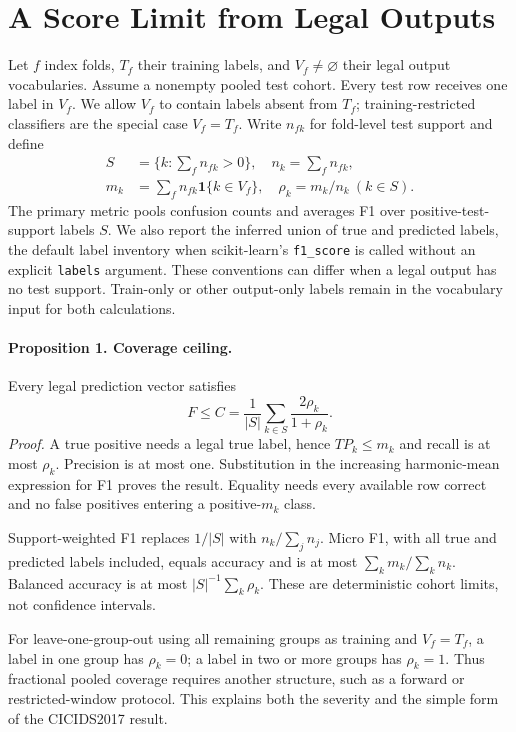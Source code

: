 \documentclass[journal]{IEEEtran}
\begin{document}
\section{A Score Limit from Legal Outputs}
Let \(f\) index folds, \(T_f\) their training labels, and \(V_f\ne\varnothing\) their legal output vocabularies. Assume a nonempty pooled test cohort. Every test row receives one label in \(V_f\). We allow \(V_f\) to contain labels absent from \(T_f\); training-restricted classifiers are the special case \(V_f=T_f\). Write \(n_{fk}\) for fold-level test support and define
\[
\begin{aligned}
S&=\{k:\textstyle\sum_f n_{fk}>0\},\quad n_k=\sum_f n_{fk},\\
m_k&=\sum_fn_{fk}\mathbf{1}\{k\in V_f\},\quad \rho_k=m_k/n_k\ (k\in S).
\end{aligned}
\]
The primary metric pools confusion counts and averages F1 over positive-test-support labels \(S\). We also report the inferred union of true and predicted labels, the default label inventory when scikit-learn's \texttt{f1\_score} is called without an explicit \texttt{labels} argument. These conventions can differ when a legal output has no test support. Train-only or other output-only labels remain in the vocabulary input for both calculations.

\paragraph{Proposition 1. Coverage ceiling.}
Every legal prediction vector satisfies
\[
F\le C=\frac{1}{|S|}\sum_{k\in S}\frac{2\rho_k}{1+\rho_k}.
\]
\emph{Proof.} A true positive needs a legal true label, hence \(TP_k\le m_k\) and recall is at most \(\rho_k\). Precision is at most one. Substitution in the increasing harmonic-mean expression for F1 proves the result. Equality needs every available row correct and no false positives entering a positive-\(m_k\) class.

Support-weighted F1 replaces \(1/|S|\) with \(n_k/\sum_jn_j\). Micro F1, with all true and predicted labels included, equals accuracy and is at most \(\sum_km_k/\sum_kn_k\). Balanced accuracy is at most \(|S|^{-1}\sum_k\rho_k\). These are deterministic cohort limits, not confidence intervals.

For leave-one-group-out using all remaining groups as training and \(V_f=T_f\), a label in one group has \(\rho_k=0\); a label in two or more groups has \(\rho_k=1\). Thus fractional pooled coverage requires another structure, such as a forward or restricted-window protocol. This explains both the severity and the simple form of the CICIDS2017 result.
\end{document}
